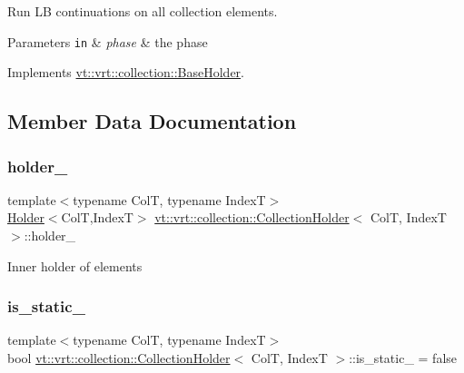 Run LB continuations on all collection elements. 


\begin{DoxyParams}[1]{Parameters}
\mbox{\tt in}  & {\em phase} & the phase \\
\hline
\end{DoxyParams}


Implements \hyperlink{structvt_1_1vrt_1_1collection_1_1_base_holder_ab9f7a730ced86b24d75b3f33ea3db3e8}{vt\+::vrt\+::collection\+::\+Base\+Holder}.



\subsection{Member Data Documentation}
\mbox{\label{structvt_1_1vrt_1_1collection_1_1_collection_holder_ae553cc92f33cac4493cafd32b4350743}} 
\subsubsection{\texorpdfstring{holder\+\_\+}{holder\_}}
{\footnotesize\ttfamily template$<$typename ColT, typename IndexT$>$ \\
\hyperlink{structvt_1_1vrt_1_1collection_1_1_holder}{Holder}$<$ColT,IndexT$>$ \hyperlink{structvt_1_1vrt_1_1collection_1_1_collection_holder}{vt\+::vrt\+::collection\+::\+Collection\+Holder}$<$ ColT, IndexT $>$\+::holder\+\_\+}

Inner holder of elements \mbox{\label{structvt_1_1vrt_1_1collection_1_1_collection_holder_ab8d1f8570cd85775b2c8317255827dae}} 
\subsubsection{\texorpdfstring{is\+\_\+static\+\_\+}{is\_static\_}}
{\footnotesize\ttfamily template$<$typename ColT, typename IndexT$>$ \\
bool \hyperlink{structvt_1_1vrt_1_1collection_1_1_collection_holder}{vt\+::vrt\+::collection\+::\+Collection\+Holder}$<$ ColT, IndexT $>$\+::is\+\_\+static\+\_\+ = false}

